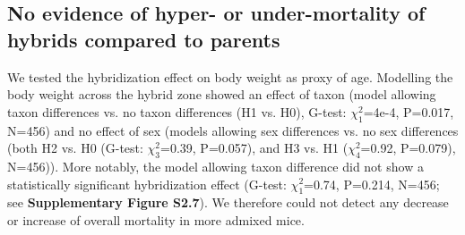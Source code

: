 \subsection{No evidence of hyper- or under-mortality of hybrids compared to parents}
We tested the hybridization effect on body weight as proxy of age. Modelling the body weight  across the hybrid zone showed an effect of taxon (model allowing taxon differences vs. no taxon differences (H1 vs. H0), G-test: $\chi_{1}^{2}$=4e-4, P=0.017, N=456) and no effect of sex (models allowing sex differences vs. no sex differences (both H2 vs. H0 (G-test: $\chi_{3}^{2}$=0.39, P=0.057), and H3 vs. H1 ($\chi_{4}^{2}$=0.92, P=0.079), N=456)). More notably, the model allowing taxon difference did not show a statistically significant hybridization effect (G-test: $\chi_{1}^{2}$=0.74, P=0.214, N=456; see \textbf{Supplementary Figure S2.7}). We therefore could not detect any decrease or increase of overall mortality in more admixed mice.

